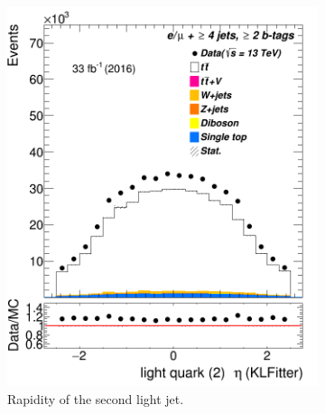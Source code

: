\begin{figure}
\begin{subfigure}{0.25\textwidth}
	\includegraphics[width=\linewidth]{ControlPlots_emujets_2016_4incl_2incl/klf_lq2_eta_emujets_2016.png}
	\caption{Rapidity of the second light jet.} \label{fig:K41}
\end{subfigure}
\hspace*{0.5cm}
	\begin{subfigure}{0.25\textwidth}

\end{subfigure}
\end{figure}
